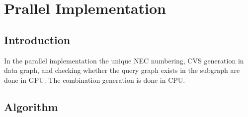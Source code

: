 \chapter{Prallel Implementation}
 \label{chap:pi}
 \section{Introduction}
\hspace{10mm}In the parallel implementation the unique NEC numbering, CVS generation in data graph, and checking whether the query graph exists in the subgraph are done in GPU. The combination generation is done in CPU.

\section{Algorithm}
 \label{sec:al}
 
